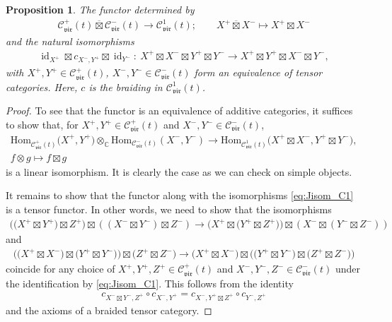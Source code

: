 \documentclass[10pt,a4paper]{amsart}
\numberwithin{equation}{section}
\newtheorem{prop}[thm]{Proposition}
 { \theoremstyle{definition}
\newtheorem{defn}[thm]{Definition}
\newtheorem{Note}[thm]{Note}
\newtheorem{exam}[thm]{Example}
\newtheorem{rem}[thm]{Remark} }
\newcommand{\Hom}{\mathrm{Hom}}
\newcommand{\id}{\operatorname{id}}
\newcommand{\TCprod}{\overline{\boxtimes}}
\newcommand{\bC}{\mathbb{C}}
\newcommand{\cC}{\mathcal{C}}
\newcommand{\catVir}{\cC_{\vir}}
\newcommand{\braid}{c}
\newcommand{\vir}{\mathfrak{vir}}
\begin{document}
\begin{prop}
\label{prop:C1_category_decomposition}
The functor determined by
\begin{gather*}
	\catVir^{+}(t)\TCprod\catVir^{-}(t) \to \catVir^{1}(t);\qquad X^{+}\TCprod X^{-} \mapsto X^{+}\boxtimes X^{-}
\end{gather*}
and the natural isomorphisms
\begin{gather}
\label{eq:Jisom_C1}
	\id_{X^{+}}\boxtimes \braid_{X^{-},Y^{+}}\boxtimes \id_{Y^{-}}\colon\ X^{+}\boxtimes X^{-} \boxtimes Y^{+}\boxtimes Y^{-} \to X^{+}\boxtimes Y^{+} \boxtimes X^{-}\boxtimes Y^{-},
\end{gather}
with $X^{+},Y^{+}\in \catVir^{+}(t)$, $X^{-},Y^{-}\in \catVir^{-}(t)$ form an equivalence of tensor categories.
Here, $\braid$ is the braiding in $\catVir^{1}(t)$.
\end{prop}
\begin{proof}
To see that the functor is an equivalence of additive categories, it suffices to show that, for $X^{+}, Y^{+}\in \catVir^{+}(t)$ and $X^{-}, Y^{-}\in \catVir^{-}(t)$,
\begin{gather*}
	\Hom_{\catVir^{+}(t)}\big(X^{+},Y^{+}\big)\otimes_{\bC} \Hom_{\catVir^{-}(t)}(X^{-},Y^{-}) \to \Hom_{\catVir^{1}(t)}\big(X^{+}\boxtimes X^{-}, Y^{+}\boxtimes Y^{-}\big), \\
	f\otimes g \mapsto f\boxtimes g
\end{gather*}
is a linear isomorphism.
It is clearly the case as we can check on simple objects.

It remains to show that the functor along with the isomorphisms \eqref{eq:Jisom_C1} is a tensor functor.
In other words, we need to show that the isomorphisms
\begin{align*}
	\big(\big(X^{+}\boxtimes Y^{+}\big)\boxtimes Z^{+}\big) \boxtimes ((X^{-}\boxtimes Y^{-})\boxtimes Z^{-})
	\to \big(X^{+}\boxtimes \big(Y^{+}\boxtimes Z^{+}\big)\big) \boxtimes (X^{-}\boxtimes (Y^{-}\boxtimes Z^{-}))
\end{align*}
and
\begin{align*}
	\big(\big(X^{+}\boxtimes X^{-}\big)\boxtimes \big(Y^{+}\boxtimes Y^{-})\big)\boxtimes \big(Z^{+}\boxtimes Z^{-}\big)
	\to \big(X^{+}\boxtimes X^{-}\big)\boxtimes \big(\big(Y^{+}\boxtimes Y^{-}\big)\boxtimes \big(Z^{+}\boxtimes Z^{-}\big)\big)
\end{align*}
coincide for any choice of $X^{+},Y^{+},Z^{+}\in \catVir^{+}(t)$ and $X^{-},Y^{-},Z^{-}\in \catVir^{-}(t)$
under the identification by \eqref{eq:Jisom_C1}.
This follows from the identity
\begin{align*}
	\braid_{X^{-}\boxtimes Y^{-},Z^{+}}\circ \braid_{X^{-},Y^{+}} = \braid_{X^{-},Y^{+}\boxtimes Z^{+}}\circ \braid_{Y^{-},Z^{+}}
\end{align*}
and the axioms of a braided tensor category.
\end{proof}
\end{document}
